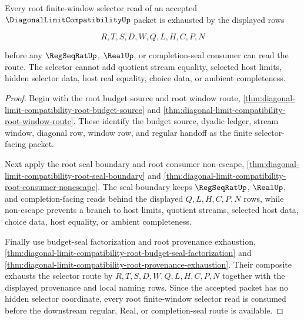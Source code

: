 \begin{theorem}
\label{thm:diagonal-limit-compatibility-root-window-selector-exhaustion}
Every root finite-window selector read of an accepted $\DiagonalLimitCompatibilityUp$ packet is exhausted by the displayed rows

$$
R,T,S,D,W,Q,L,H,C,P,N
$$

before any $\RegSeqRatUp$, $\RealUp$, or completion-seal consumer can read the route. The selector cannot add quotient stream equality, selected host limits, hidden selector data, host real equality, choice data, or ambient completeness.
\end{theorem}
\begin{proof}
Begin with the root budget source and root window route, \autoref{thm:diagonal-limit-compatibility-root-budget-source} and \autoref{thm:diagonal-limit-compatibility-root-window-route}. These identify the budget source, dyadic ledger, stream window, diagonal row, window row, and regular handoff as the finite selector-facing packet.

Next apply the root seal boundary and root consumer non-escape, \autoref{thm:diagonal-limit-compatibility-root-seal-boundary} and \autoref{thm:diagonal-limit-compatibility-root-consumer-nonescape}. The seal boundary keeps $\RegSeqRatUp$, $\RealUp$, and completion-facing reads behind the displayed $Q,L,H,C,P,N$ rows, while non-escape prevents a branch to host limits, quotient streams, selected host data, choice data, host equality, or ambient completeness.

Finally use budget-seal factorization and root provenance exhaustion, \autoref{thm:diagonal-limit-compatibility-root-budget-seal-factorization} and \autoref{thm:diagonal-limit-compatibility-root-provenance-exhaustion}. Their composite exhausts the selector route by $R,T,S,D,W,Q,L,H,C,P,N$ together with the displayed provenance and local naming rows. Since the accepted packet has no hidden selector coordinate, every root finite-window selector read is consumed before the downstream regular, Real, or completion-seal route is available.
\end{proof}

